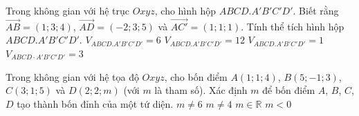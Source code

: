 \begin{ex}%
	Trong không gian với hệ trục $Oxyz$, cho hình hộp $ABCD.A'B'C'D'$. Biết rằng $\overrightarrow{A B}=(1;3;4)$, $\overrightarrow{A D}=(-2;3;5)$ và $\overrightarrow{A C'}=(1;1;1)$. Tính thể tích hình hộp  $ABCD.A'B'C'D'$.
	 \choice
		{$V_{ABCD.A'B'C'D'}=6$} 
		 {$V_{ABCD.A'B'C'D'}=12$}
		{\True $V_{ABCD.A'B'C'D'}=1$} 
		{$V_{ABCD \cdot A'B'C'D'}=3$} 
\end{ex}

\begin{ex}%
	Trong không gian với hệ tọa độ $Oxyz$, cho bốn điểm $A(1;1;4)$, $ B(5;-1;3)$, $C(3;1;5)$ và $D(2;2;m)$ (với $m$ là tham số). Xác định $m$ để bốn điểm $A$, $B$, $C$, $D$ tạo thành bốn đỉnh của một tứ  diện.
	\choice 
		{\True  $m \neq 6$}
		{$m  \neq 4$}
		{$m \in  \mathbb{R}$}
		 {$m<0$}
\end{ex}

